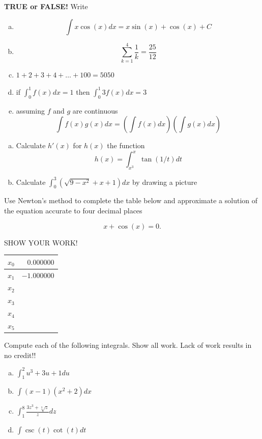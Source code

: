 \documentclass[11pt]{exam}
\theoremstyle{definition}
\begin{document}
\begin{questions}

\addpoints

\question[10]\mbox{}
\textbf{TRUE or FALSE!}  Write 
\begin{enumerate}[(a)]
\item  $$\int x\cos(x)dx = x\sin(x) + \cos(x) + C$$
\vspace{1.2in}
\item  $$\sum_{k=1}^4 \frac{1}{k} = \frac{25}{12}$$
\vspace{1.2in}
\item  $1 + 2 + 3 + 4 + \dots + 100 = 5050$
\vspace{1.2in}
\item  if $\int_0^1 f(x)dx = 1$ then $\int_0^1 3f(x) dx = 3$
\vspace{1.2in}
\item  assuming $f$ and $g$ are continuous
$$\int f(x)g(x)dx = \left(\int f(x)dx\right)\left(\int g(x)dx\right)$$
\vspace{1.2in}
\end{enumerate}

\newpage
\question[10]\mbox{}
\begin{enumerate}[(a)]
\item  Calculate $h'(x)$ for $h(x)$ the function
$$h(x) = \int_{x^3}^x \tan(1/t) dt$$
\vspace{3in}
\item  Calculate $\int_0^3 (\sqrt{9-x^2} + x + 1)dx$ by drawing a picture
\end{enumerate}

\newpage
\question[10]\mbox{}
Use Newton's method to complete the table below and approximate a solution of the equation accurate to four decimal places

$$x + \cos(x) = 0.$$

SHOW YOUR WORK!

\begin{center}
\begin{tabular}{c|r}
$x_0$  &  $0.000000$\\\hline
$x_1$  &  $-1.000000$\\\hline
$x_2$  & \\\hline
$x_3$  & \\\hline
$x_4$  & \\\hline
$x_5$  & 
\end{tabular}
\end{center}

\newpage
\question[10]\mbox{}
Compute each of the following integrals.  Show all work.
Lack of work results in no credit!!
\begin{enumerate}[(a)]
\item $\int_1^2 u^3 + 3u + 1 du$
\vspace{2in}
\item $\int (x-1)(x^2+2) dx$
\vspace{2in}
\item $\int_1^8 \frac{3z^3 + \sqrt[3]{z}}{z}dz$
\vspace{2in}
\item $\int \csc(t)\cot(t)dt$
\end{enumerate}


\end{questions}
\end{document}
